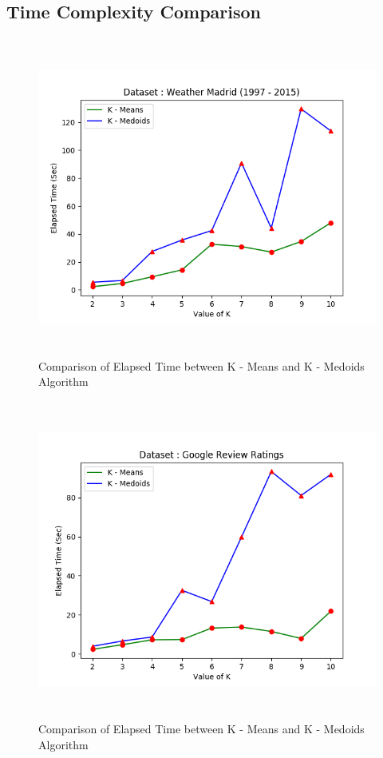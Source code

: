 \documentclass[12pt]{article}
\begin{document}
\subsection{Time Complexity Comparison}

\begin{figure}[H]
	\centering
	\includegraphics[width = \linewidth, height = 10.5cm]{Weather.png}
	\caption{Comparison of Elapsed Time between K - Means and K - Medoids Algorithm}
	\label{fig:weather}
\end{figure}

\begin{figure}[H]
	\centering
	\includegraphics[width = \linewidth, height = 10.5cm]{Google.png}
	\caption{Comparison of Elapsed Time between K - Means and K - Medoids Algorithm}
	\label{fig:google}
\end{figure}
\end{document}
